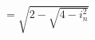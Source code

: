 \documentclass[preview]{standalone}
\begin{document}
\begin{align*}
= \sqrt{2 - \sqrt{4 - i_n^2}}
\end{align*}
\end{document}
